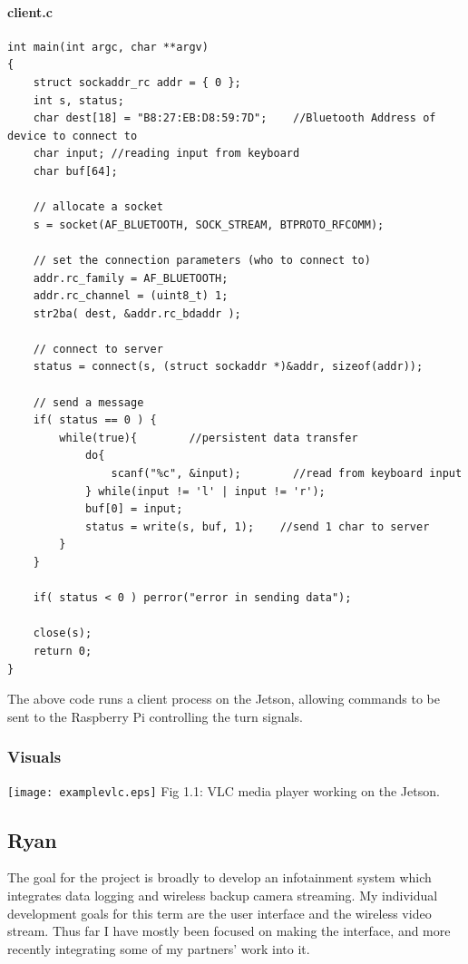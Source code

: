 \documentclass[onecolumn, draftclsnofoot,10pt, compsoc]{IEEEtran}
\begin{document}
\paragraph{client.c}
\begin{verbatim}
int main(int argc, char **argv)
{
    struct sockaddr_rc addr = { 0 };
    int s, status;
    char dest[18] = "B8:27:EB:D8:59:7D";    //Bluetooth Address of device to connect to
    char input; //reading input from keyboard
    char buf[64];

    // allocate a socket
    s = socket(AF_BLUETOOTH, SOCK_STREAM, BTPROTO_RFCOMM);

    // set the connection parameters (who to connect to)
    addr.rc_family = AF_BLUETOOTH;
    addr.rc_channel = (uint8_t) 1;
    str2ba( dest, &addr.rc_bdaddr );

    // connect to server
    status = connect(s, (struct sockaddr *)&addr, sizeof(addr));

    // send a message
    if( status == 0 ) {
        while(true){        //persistent data transfer
            do{
                scanf("%c", &input);        //read from keyboard input
            } while(input != 'l' | input != 'r');
            buf[0] = input;
            status = write(s, buf, 1);    //send 1 char to server
        }
    }

    if( status < 0 ) perror("error in sending data");

    close(s);
    return 0;
}
\end{verbatim}
The above code runs a client process on the Jetson, allowing commands to be sent to the Raspberry Pi controlling the turn signals.

\subsubsection{Visuals}
\texttt{[image: examplevlc.eps]}
Fig 1.1: VLC media player working on the Jetson.

\newpage
\subsection{Ryan}
The goal for the project is broadly to develop an infotainment system which integrates data logging and wireless backup camera streaming. My individual development goals for this term are the user interface and the wireless video stream. Thus far I have mostly been focused on making the interface, and more recently integrating some of my partners' work into it.\par
\end{document}
